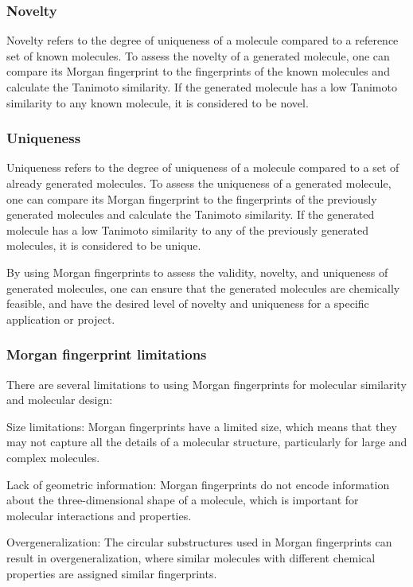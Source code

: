 \subsubsection{Novelty}
Novelty refers to the degree of uniqueness of a molecule compared to a reference set of known molecules. To assess the novelty of a generated molecule, one can compare its Morgan fingerprint to the fingerprints of the known molecules and calculate the Tanimoto similarity. If the generated molecule has a low Tanimoto similarity to any known molecule, it is considered to be novel.

\subsubsection{Uniqueness}
Uniqueness refers to the degree of uniqueness of a molecule compared to a set of already generated molecules. To assess the uniqueness of a generated molecule, one can compare its Morgan fingerprint to the fingerprints of the previously generated molecules and calculate the Tanimoto similarity. If the generated molecule has a low Tanimoto similarity to any of the previously generated molecules, it is considered to be unique.

By using Morgan fingerprints to assess the validity, novelty, and uniqueness of generated molecules, one can ensure that the generated molecules are chemically feasible, and have the desired level of novelty and uniqueness for a specific application or project.

\subsubsection{Morgan fingerprint limitations}
There are several limitations to using Morgan fingerprints for molecular similarity and molecular design:

Size limitations: Morgan fingerprints have a limited size, which means that they may not capture all the details of a molecular structure, particularly for large and complex molecules.

Lack of geometric information: Morgan fingerprints do not encode information about the three-dimensional shape of a molecule, which is important for molecular interactions and properties.

Overgeneralization: The circular substructures used in Morgan fingerprints can result in overgeneralization, where similar molecules with different chemical properties are assigned similar fingerprints.

